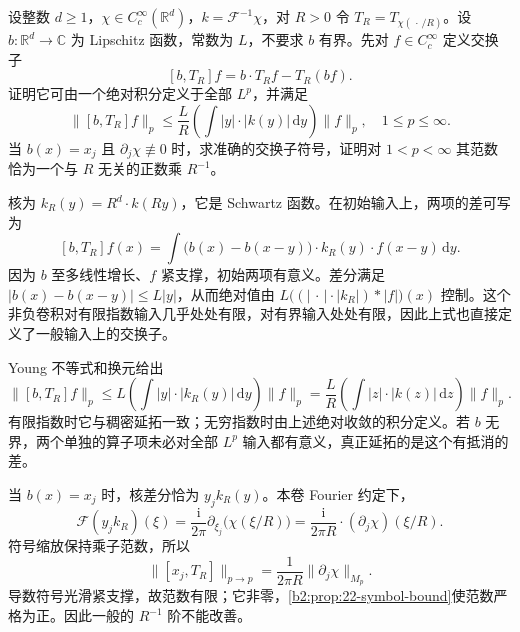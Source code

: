 \begin{exercise}\label{b2:ex:22-new-7}
设整数 \(d\geq1\)，\(\chi\in C_c^\infty(\mathbb R^d)\)，\(k=\mathcal F^{-1}\chi\)，对 \(R>0\) 令
\(T_R=T_{\chi(\,\cdot\,/R)}\)。设 \(b:\mathbb R^d\to\mathbb C\) 为 Lipschitz 函数，常数为 \(L\)，不要求 \(b\) 有界。先对 \(f\in C_c^\infty\) 定义交换子
\[
 [b,T_R]f=b\cdot T_Rf-T_R(bf).
\]
证明它可由一个绝对积分定义于全部 \(L^p\)，并满足
\[
 \|[b,T_R]f\|_p
 \leq\frac L R\left(\int|y|\cdot|k(y)|\,\mathrm dy\right)\|f\|_p,
 \quad1\leq p\leq\infty.
\]
当 \(b(x)=x_j\) 且 \(\partial_j\chi\not\equiv0\) 时，求准确的交换子符号，证明对 \(1<p<\infty\) 其范数恰为一个与 \(R\) 无关的正数乘 \(R^{-1}\)。
\end{exercise}
\begin{solution}
核为 \(k_R(y)=R^d\cdot k(Ry)\)，它是 Schwartz 函数。在初始输入上，两项的差可写为
\[
 [b,T_R]f(x)
 =\int\bigl(b(x)-b(x-y)\bigr)\cdot k_R(y)\cdot f(x-y)\,\mathrm dy.
\]
因为 \(b\) 至多线性增长、\(f\) 紧支撑，初始两项有意义。差分满足
\(|b(x)-b(x-y)|\leq L|y|\)，从而绝对值由
\(L\bigl((|\,\cdot\,|\cdot|k_R|)*|f|\bigr)(x)\) 控制。这个非负卷积对有限指数输入几乎处处有限，对有界输入处处有限，因此上式也直接定义了一般输入上的交换子。

Young 不等式和换元给出
\[
 \|[b,T_R]f\|_p
 \leq L\left(\int|y|\cdot|k_R(y)|\,\mathrm dy\right)\|f\|_p
 =\frac L R\left(\int|z|\cdot|k(z)|\,\mathrm dz\right)\|f\|_p.
\]
有限指数时它与稠密延拓一致；无穷指数时由上述绝对收敛的积分定义。若 \(b\) 无界，两个单独的算子项未必对全部 \(L^p\) 输入都有意义，真正延拓的是这个有抵消的差。

当 \(b(x)=x_j\) 时，核差分恰为 \(y_jk_R(y)\)。本卷 Fourier 约定下，
\[
 \mathcal F(y_jk_R)(\xi)
 =\frac{\mathrm i}{2\pi}\partial_{\xi_j}\bigl(\chi(\xi/R)\bigr)
 =\frac{\mathrm i}{2\pi R}\cdot(\partial_j\chi)(\xi/R).
\]
符号缩放保持乘子范数，所以
\[
 \|[x_j,T_R]\|_{p\to p}
 =\frac1{2\pi R}\|\partial_j\chi\|_{M_p}.
\]
导数符号光滑紧支撑，故范数有限；它非零，\cref{b2:prop:22-symbol-bound}使范数严格为正。因此一般的 \(R^{-1}\) 阶不能改善。
\end{solution}

